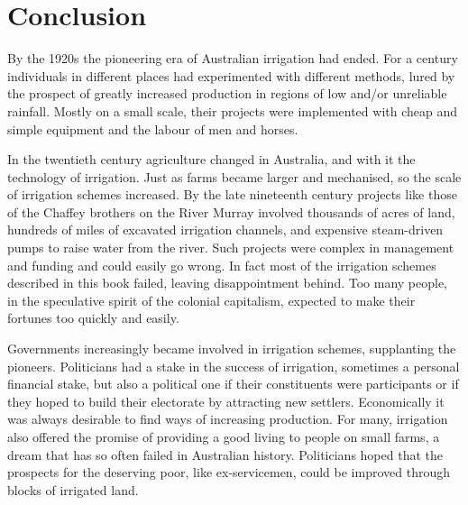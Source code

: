 
\chapter{Conclusion}

\label{ch:reflect}

\setcounter{endnote}{0}

By the 1920s the pioneering era of Australian irrigation had
ended. For a century individuals in different places had experimented
with different methods, lured by the prospect of greatly increased
production in regions of low and/or unreliable rainfall. Mostly on a
small scale, their projects were implemented with cheap and simple
equipment and the labour of men and horses.

In the twentieth century agriculture changed in Australia, and with it
the technology of irrigation. Just as farms became larger and
mechanised, so the scale of irrigation schemes increased. By the late
nineteenth century projects like those of the Chaffey brothers
 on the River Murray  involved
thousands of acres of land, hundreds of miles of excavated irrigation
channels, and expensive
steam-driven pumps to raise water from the river. Such projects were
complex in management and funding and could easily go wrong. In fact
most of the irrigation sch\-emes described in this book failed,
leaving disappointment behind. Too many people, in the speculative
spirit of the colonial capitalism, expected to make their fortunes too
quickly and easily.

Governments increasingly became involved in irrigation schemes,
supplanting the pioneers. Politicians had a stake in the success of
irrigation, sometimes a personal financial stake, but
also a political one if their constituents were participants or if
they hoped to build their electorate by attracting new
settlers. Economically it was always desirable to find ways of
increasing production. For many, irrigation also offered the promise
of providing a good living to people on small farms, a dream that has
so often failed in Australian history. Politicians hoped that the
prospects for the deserving poor, like ex-servicemen, could be
improved through blocks of irrigated land.


